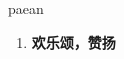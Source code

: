 
\begin{frame}
{\huge paean}
\begin{center}
\begin{enumerate}\Large
  \item \textbf{欢乐颂，赞扬}
\end{enumerate}
\end{center}
\end{frame}
